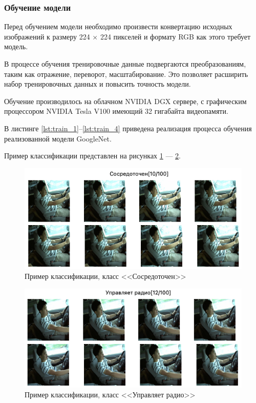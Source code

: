 \subsubsection{Обучение модели}
Перед обучением модели необходимо произвести конвертацию исходных изображений к размеру 224 × 224 пикселей и формату RGB как этого требует модель.

В процессе обучения тренировочные данные подвергаются преобразованиям, таким как отражение, переворот, масштабирование. Это позволяет расширить набор тренировочных данных и повысить точность модели.

Обучение производилось на облачном NVIDIA DGX \cite{dgx} сервере, с графическим процессором NVIDIA Tesla V100 имеющий 32 гигабайта видеопамяти.

В листинге \ref{lst:train_1}--\ref{lst:train_4} приведена реализация процесса обучения реализованной модели GoogleNet.

Пример классификации представлен на рисунках \ref{fig:train_example_1} --- \ref{fig:train_example_2}.

\begin{figure}[H]
	\centering
	\includegraphics[scale=0.8]{img/train_example.png}
	\caption{Пример классификации, класс <<Сосредоточен>>}
	\label{fig:train_example_1}
\end{figure}

\begin{figure}[H]
	\centering
	\includegraphics[scale=0.8]{img/train_example_2.png}
	\caption{Пример классификации, класс <<Управляет радио>>}
	\label{fig:train_example_2}
\end{figure}

